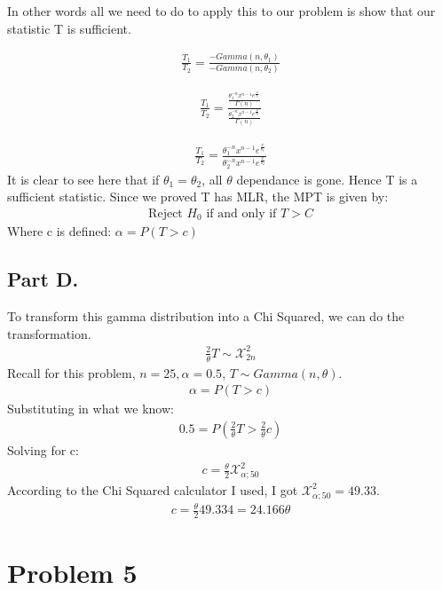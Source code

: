 \documentclass{article}
\begin{document}
In other words all we need to do to apply this to our problem is show that our statistic T is sufficient.

\begin{align*}
\frac{T_1}{T_2} = \frac{ - Gamma(n,\theta_1) }{- Gamma(n,\theta_2)}
\end{align*}

\begin{align*}
\frac{T_1}{T_2} = \frac{ \frac{\theta_1^{-n} x^{n-1} e^{\frac{x}{\theta_1}}}{\Gamma(n)} }{\frac{\theta_2^{-n} x^{n-1} e^{\frac{x}{\theta_2}}}{\Gamma(n)}}
\end{align*}

\begin{align*}
\frac{T_1}{T_2} = \frac{ {\theta_1^{-n} x^{n-1} e^{\frac{x}{\theta_1}}}}{{\theta_2^{-n} x^{n-1} e^{\frac{x}{\theta_2}}}}
\end{align*}
It is clear to see here that if $\theta_1=\theta_2$, all $\theta$ dependance is gone. Hence T is a sufficient statistic. Since we proved T has MLR, the MPT is given by:
\begin{align*}
\text{Reject } H_0 \text{ if and only if } T>C 
\end{align*}
Where c is defined: $\alpha=P(T>c)$
\subsection*{Part D.}
To transform this gamma distribution into a Chi Squared, we can do the transformation.
\begin{align*}
\frac{2}{\theta} T \sim \mathcal{X}_{2n}^{2}
\end{align*}
Recall for this problem, $n=25, \alpha = 0.5$, $T\sim Gamma(n,\theta)$.
\begin{align*}
\alpha=P(T>c)
\end{align*}
Substituting in what we know:
\begin{align*}
0.5=P(\frac{2}{\theta} T > \frac{2}{\theta} c)
\end{align*}
Solving for c:
\begin{align*}
c = \frac{\theta}{2} \mathcal{X}_{\alpha;50}^{2}
\end{align*}
According to the Chi Squared calculator I used, I got $\mathcal{X}_{\alpha;50}^{2} = 49.33$.
\begin{align*}
c = \frac{\theta}{2} 49.334 = 24.166 \theta
\end{align*}
\clearpage

\section*{Problem 5}
\end{document}
